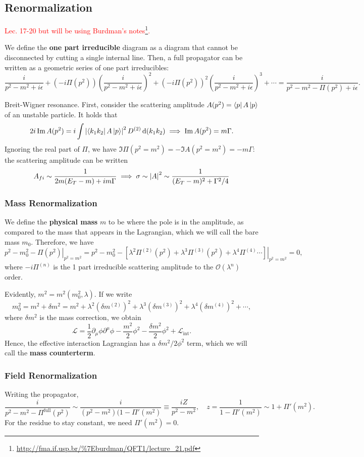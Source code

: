 \documentclass{article}
\begin{document}
\subsection{Renormalization}
\textcolor{red}{Lec. 17-20 but will be using Burdman's notes\footnote{\url{http://fma.if.usp.br/\%7Eburdman/QFT1/lecture_21.pdf}}.}



We define the \textbf{one part irreducible} diagram as a diagram that cannot be disconnected by cutting a single internal line. Then, a full propagator can be written as a geometric series of one part irreducibles:
$$\frac i{p^2-m^2+i\epsilon}+(-i\Pi(p^2))\left(\frac i{p^2-m^2+i\epsilon}\right)^2+(-i\Pi(p^2))^2\left(\frac i{p^2-m^2+i\epsilon}\right)^3+\cdots=\frac i{p^2-m^2-\Pi(p^2)+i\epsilon}.$$

\example Breit-Wigner resonance. First, consider the scattering amplitude $A(p^2)=\bra pA\ket p$ of an unstable particle. It holds that 
$$2i\Im A(p^2)=i\int\left\lvert\bra{k_1k_2}A\ket p\right\rvert^2 D^{(2)}\dd(k_1k_2)\implies \Im A(p^2)=m\Gamma.$$ 
Ignoring the real part of $\Pi$, we have $\Im\Pi(p^2=m^2)=-\Im A(p^2=m^2)=-m\Gamma$: the scattering amplitude can be written 
$$A_{fi}\sim \frac 1{2m(E_T-m)+im\Gamma}\implies\sigma\sim\left\lvert A\right\rvert^2\sim\frac 1{(E_T-m)^2+\Gamma^2/4}$$

\subsubsection{Mass Renormalization}
We define the \textbf{physical mass} $m$ to be where the pole is in the amplitude, as compared to the mass that appears in the Lagrangian, which we will call the bare mass $m_0$. Therefore, we have 
$$p^2-m_0^2-\left.\Pi(p^2)\right|_{p^2=m^2}=p^2-m_0^2-\left.\left[\lambda^2\Pi^{(2)}(p^2)+\lambda^3\Pi^{(3)}(p^2)+\lambda^4\Pi^{(4)}\cdots\right]\right|_{p^2=m^2}=0,$$
where $-i\Pi^{(n)}$ is the 1 part irreducible scattering amplitude to the $\mathcal O(\lambda^n)$ order.

Evidently, $m^2=m^2(m_0^2,\lambda)$. If we write 
$$m_0^2=m^2+\delta m^2=m^2+\lambda^2(\delta m^{(2)})^2+\lambda^3(\delta m^{(3)})^2+\lambda^4(\delta m^{(4)})^2+\cdots,$$
where $\delta m^2$ is the mass correction, we obtain 
$$\mathcal L=\frac 12\partial_\mu\phi\partial^\mu\phi-\frac{m^2}2\phi^2-\frac{\delta m^2}2\phi^2+\mathcal L_\text{int}.$$
Hence, the effective interaction Lagrangian has a $\delta m^2/2\phi^2$ term, which we will call the \textbf{mass counterterm}. 

\subsubsection{Field Renormalization}
Writing the propagator,
$$\frac i{p^2-m^2-\Pi^\text{full}(p^2)}\sim\frac i{(p^2-m^2)(1-\Pi'(m^2)}\equiv \frac{iZ}{p^2-m^2},\quad z=\frac{1}{1-\Pi'(m^2)}\sim 1+\Pi'(m^2).$$
For the residue to stay constant, we need $\Pi'(m^2)=0$.
\end{document}

